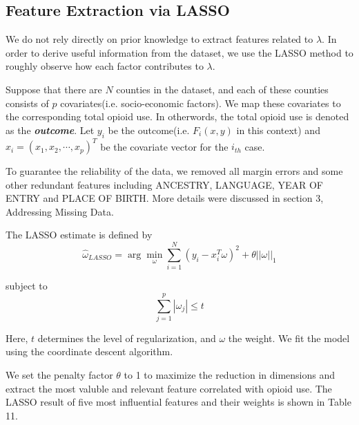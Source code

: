 
\subsection{Feature Extraction via LASSO}
We do not rely directly on prior knowledge to extract features related to $\lambda$. In order to derive useful information from the dataset, we use the LASSO method to roughly observe how each factor contributes to $\lambda$. 

Suppose that there are $N$ counties in the dataset, and each of these counties consists of $p$ covariates(i.e. socio-economic factors). We map these covariates to the corresponding total opioid use. In otherwords, the total opioid use is denoted as the \textbf{ \itshape outcome}. Let $y_i$ be the outcome(i.e. $F_i(x,y)$ in this context) and $x_i = (x_1, x_2, \cdots, x_p)^T$ be the covariate vector for the $i_{th}$ case.

To guarantee the reliability of the data, we removed all margin errors and some other redundant features including ANCESTRY, LANGUAGE, YEAR OF ENTRY and PLACE OF BIRTH. More details were discussed in section 3, Addressing Missing Data.

The LASSO estimate is defined by\cite{7}
\begin{equation}
\hat{\omega}_{LASSO}=
\arg\min_{\omega} \sum_{i=1}^{N}(y_i - x_i^T\omega)^2 + \theta||\omega||_1
\end{equation}

subject to
\begin{equation}
 \sum_{j=1}^{p}|\omega_j|\leq t
\end{equation}

Here, $t$ determines the level of regularization, and $\omega$ the weight. We fit the model using the coordinate descent algorithm. \cite{6}

We set the penalty factor $\theta$ to 1 to maximize the reduction in dimensions and extract the most valuble and relevant feature correlated with opioid use. The LASSO result of five most influential features and their weights is shown in Table 11.


